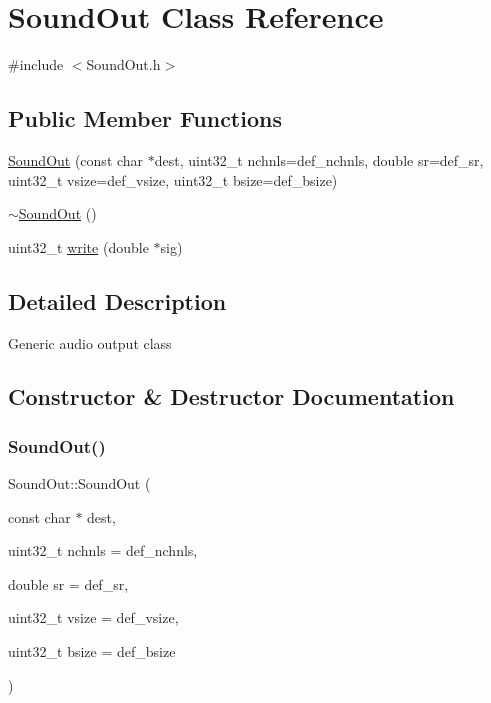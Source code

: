 \hypertarget{class_sound_out}{}\section{Sound\+Out Class Reference}
\label{class_sound_out}


{\ttfamily \#include $<$Sound\+Out.\+h$>$}

\subsection*{Public Member Functions}
\begin{DoxyCompactItemize}
\item 
\hyperlink{class_sound_out_aaf7273b64d412247edff8264dc2b8f15}{Sound\+Out} (const char $\ast$dest, uint32\+\_\+t nchnls=def\+\_\+nchnls, double sr=def\+\_\+sr, uint32\+\_\+t vsize=def\+\_\+vsize, uint32\+\_\+t bsize=def\+\_\+bsize)
\item 
\hyperlink{class_sound_out_acef6789ce8fd42636630cd19287d23d6}{$\sim$\+Sound\+Out} ()
\item 
uint32\+\_\+t \hyperlink{class_sound_out_ae2cb2b2e4679a44c467e11f1893961f5}{write} (double $\ast$sig)
\end{DoxyCompactItemize}


\subsection{Detailed Description}
Generic audio output class 

\subsection{Constructor \& Destructor Documentation}
\mbox{\label{class_sound_out_aaf7273b64d412247edff8264dc2b8f15}} 
\subsubsection{\texorpdfstring{Sound\+Out()}{SoundOut()}}
{\footnotesize\ttfamily Sound\+Out\+::\+Sound\+Out (\begin{DoxyParamCaption}\item[{const char $\ast$}]{dest,  }\item[{uint32\+\_\+t}]{nchnls = {\ttfamily def\+\_\+nchnls},  }\item[{double}]{sr = {\ttfamily def\+\_\+sr},  }\item[{uint32\+\_\+t}]{vsize = {\ttfamily def\+\_\+vsize},  }\item[{uint32\+\_\+t}]{bsize = {\ttfamily def\+\_\+bsize} }\end{DoxyParamCaption})}

